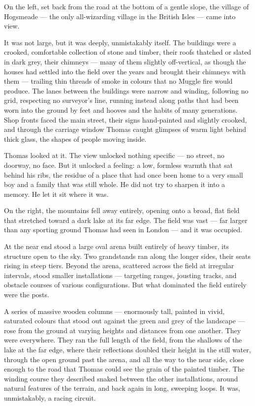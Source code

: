 On the left, set back from the road at the bottom of a gentle slope, the village of Hogsmeade --- the only all-wizarding village in the British Isles --- came into view.
 
It was not large, but it was deeply, unmistakably itself. The buildings were a crooked, comfortable collection of stone and timber, their roofs thatched or slated in dark grey, their chimneys --- many of them slightly off-vertical, as though the houses had settled into the field over the years and brought their chimneys with them --- trailing thin threads of smoke in colours that no Muggle fire would produce. The lanes between the buildings were narrow and winding, following no grid, respecting no surveyor's line, running instead along paths that had been worn into the ground by feet and hooves and the habits of many generations. Shop fronts faced the main street, their signs hand-painted and slightly crooked, and through the carriage window Thomas caught glimpses of warm light behind thick glass, the shapes of people moving inside.
 
Thomas looked at it. The view unlocked nothing specific --- no street, no doorway, no face. But it unlocked a feeling: a low, formless warmth that sat behind his ribs, the residue of a place that had once been home to a very small boy and a family that was still whole. He did not try to sharpen it into a memory. He let it sit where it was.
 
On the right, the mountains fell away entirely, opening onto a broad, flat field that stretched toward a dark lake at its far edge. The field was vast --- far larger than any sporting ground Thomas had seen in London --- and it was occupied.
 
At the near end stood a large oval arena built entirely of heavy timber, its structure open to the sky. Two grandstands ran along the longer sides, their seats rising in steep tiers. Beyond the arena, scattered across the field at irregular intervals, stood smaller installations --- targeting ranges, jousting tracks, and obstacle courses of various configurations. But what dominated the field entirely were the posts.
 
A series of massive wooden columns --- enormously tall, painted in vivid, saturated colours that stood out against the green and grey of the landscape --- rose from the ground at varying heights and distances from one another. They were everywhere. They ran the full length of the field, from the shallows of the lake at the far edge, where their reflections doubled their height in the still water, through the open ground past the arena, and all the way to the near side, close enough to the road that Thomas could see the grain of the painted timber. The winding course they described snaked between the other installations, around natural features of the terrain, and back again in long, sweeping loops. It was, unmistakably, a racing circuit.
 
